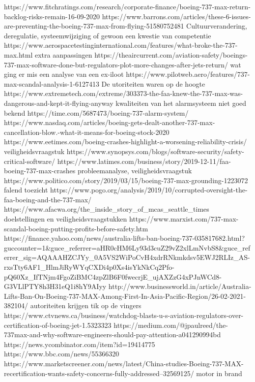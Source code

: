 https://www.fitchratings.com/research/corporate-finance/boeing-737-max-return-backlog-risks-remain-16-09-2020
https://www.barrons.com/articles/these-6-issues-are-preventing-the-boeing-737-max-from-flying-51580752481
Cultuurverandering, deregulatie, systeemwijziging of gewoon een kwestie van competentie
https://www.aerospacetestinginternational.com/features/what-broke-the-737-max.html
extra aanpassingen
https://theaircurrent.com/aviation-safety/boeings-737-max-software-done-but-regulators-plot-more-changes-after-jets-return/
wat ging er mis een analyse van een ex-iloot
https://www.pilotweb.aero/features/737-max-scandal-analysis-1-6127413
De utoriteiten waren op de hoogte 
https://www.extremetech.com/extreme/303373-the-faa-knew-the-737-max-was-dangerous-and-kept-it-flying-anyway
kwaliteiten van het alarmsysteem niet goed bekend
https://time.com/5687473/boeing-737-alarm-system/
https://www.nasdaq.com/articles/boeing-gets-dealt-another-737-max-cancellation-blow.-what-it-means-for-boeing-stock-2020
https://www.eetimes.com/boeing-crashes-highlight-a-worsening-reliability-crisis/
veiligheidsvraagstuk
https://www.synopsys.com/blogs/software-security/safety-critical-software/
https://www.latimes.com/business/story/2019-12-11/faa-boeing-737-max-crashes
probleemanalyse, veiligheidsvraagstuk
https://www.politico.com/story/2019/03/15/boeing-737-max-grounding-1223072
falend toezicht
https://www.pogo.org/analysis/2019/10/corrupted-oversight-the-faa-boeing-and-the-737-max/
https://www.afacwa.org/the_inside_story_of_mcas_seattle_times
doelstellingen en veiligheidsvraagstukken
https://www.marxist.com/737-max-scandal-boeing-putting-profits-before-safety.htm
https://finance.yahoo.com/news/australia-lifts-ban-boeing-737-035817682.html?guccounter=1&guce_referrer=aHR0cHM6Ly93d3cuZ29vZ2xlLmNvbS8&guce_referrer_sig=AQAAAHZCJYy_0A5VS2WiPoCvH4xdrRNkmkdsv5EWJ2RLIz_AS-rxsTty6AF1_HlmJiRyWYqCXDi4p0Xs4isYkNkCq2Pfo-pQ60Xz_IfTNjm4FgoZiBMC4zpZlB6F0fwecrjE_ujAXZzG4xPJnWCd8-G3VLlPTY8h3H31eQ1i8hY9AIyy
http://www.businessworld.in/article/Australia-Lifts-Ban-On-Boeing-737-MAX-Among-First-In-Asia-Pacific-Region/26-02-2021-382104/
autoriteiten krijgen tik op de vingers
https://www.ctvnews.ca/business/watchdog-blasts-u-s-aviation-regulators-over-certification-of-boeing-jet-1.5323323
https://medium.com/@jpaulreed/the-737max-and-why-software-engineers-should-pay-attention-a041290994bd
https://news.ycombinator.com/item?id=19414775
https://www.bbc.com/news/55366320
https://www.marketscreener.com/news/latest/China-studies-Boeing-737-MAX-recertification-wants-safety-concerns-fully-addressed--32569125/
motor in brand
